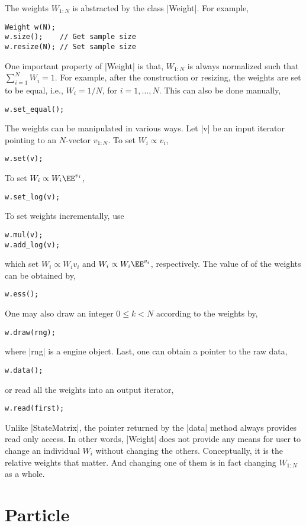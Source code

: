 The weights $W_{1:N}$ is abstracted by the class |Weight|. For example,
\begin{verbatim}
Weight w(N);
w.size();    // Get sample size
w.resize(N); // Set sample size
\end{verbatim}
One important property of |Weight| is that, $W_{1:N}$ is always normalized such
that $\sum_{i=1}^N W_i = 1$. For example, after the construction or resizing,
the weights are set to be equal, i.e., $W_i = 1 / N$, for $i = 1,\dots,N$. This
can also be done manually,
\begin{verbatim}
w.set_equal();
\end{verbatim}
The weights can be manipulated in various ways. Let |v| be an input iterator
pointing to an $N$-vector $v_{1:N}$. To set $W_i \propto v_i$,
\begin{verbatim}
w.set(v);
\end{verbatim}
To set $ W_i \propto W_i\EE^{v_i}$,
\begin{verbatim}
w.set_log(v);
\end{verbatim}
To set weights incrementally, use
\begin{verbatim}
w.mul(v);
w.add_log(v);
\end{verbatim}
which set $W_i \propto W_iv_i$ and $W_i \propto W_i \EE^{v_i}$, respectively.
The value of \ess of the weights can be obtained by,
\begin{verbatim}
w.ess();
\end{verbatim}
One may also draw an integer $0 \le k < N$ according to the weights by,
\begin{verbatim}
w.draw(rng);
\end{verbatim}
where |rng| is a \rng engine object. Last, one can obtain a pointer to the raw
data,
\begin{verbatim}
w.data();
\end{verbatim}
or read all the weights into an output iterator,
\begin{verbatim}
w.read(first);
\end{verbatim}
Unlike |StateMatrix|, the pointer returned by the |data| method always provides
read only access. In other words, |Weight| does not provide any means for user
to change an individual $W_i$ without changing the others. Conceptually, it is
the relative weights that matter. And changing one of them is in fact changing
$W_{1:N}$ as a whole.

\section{Particle}
\label{sec:Particle}

